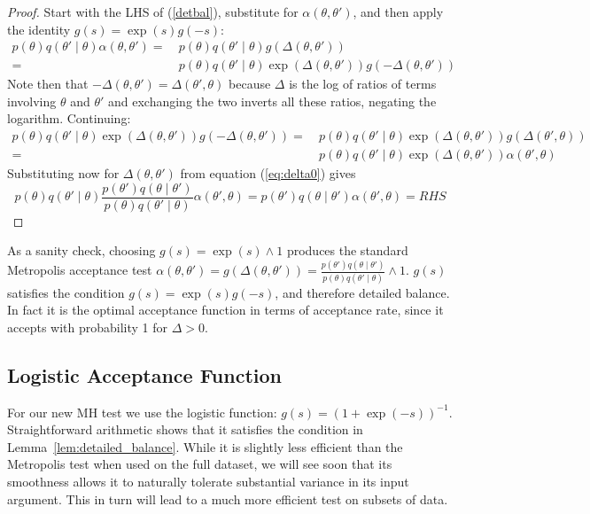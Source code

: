 \documentclass{article}
\begin{document}
\begin{proof}
  Start with the LHS of (\ref{detbal}), substitute for $\alpha(\theta,\theta')$, and then apply the
  identity $g(s) = \exp(s)g(-s)$:
  \begin{equation}\label{detbal1}
    \begin{split}
      p(\theta)q(\theta'\mid\theta)\alpha(\theta,\theta') =~ & p(\theta)q(\theta'\mid\theta)g(\Delta(\theta,\theta'))\\
      =~ & p(\theta)q(\theta'\mid\theta)\exp(\Delta(\theta,\theta'))g(-\Delta(\theta,\theta'))
    \end{split}
  \end{equation}
  Note then that $-\Delta(\theta,\theta') = \Delta(\theta',\theta)$ because $\Delta$ is the log of ratios of
  terms involving $\theta$ and $\theta'$ and exchanging the two inverts all these ratios, negating the
  logarithm. Continuing:
  \begin{equation}\label{detbal2}
    \begin{split}
    p(\theta)q(\theta'\mid\theta)\exp(\Delta(\theta,\theta'))g(-\Delta(\theta,\theta')) = ~ & p(\theta)q(\theta'\mid\theta)\exp(\Delta(\theta,\theta'))g(\Delta(\theta',\theta))\\
    = ~ & p(\theta)q(\theta'\mid\theta)\exp(\Delta(\theta,\theta'))\alpha(\theta',\theta)
    \end{split}
  \end{equation}
  Substituting now for $\Delta(\theta,\theta')$ from equation (\ref{eq:delta0}) gives
  \begin{equation*}\label{detbal3}
    p(\theta)q(\theta'\mid\theta)\frac{p(\theta')q(\theta\mid\theta')}{p(\theta)q(\theta'\mid\theta)}\alpha(\theta',\theta)
      = p(\theta')q(\theta\mid\theta')\alpha(\theta',\theta) = RHS
  \end{equation*}
\end{proof}

As a sanity check, choosing $g(s) = \exp(s) \wedge 1$ produces the
standard Metropolis acceptance test $\alpha(\theta,\theta') = g(\Delta(\theta,\theta')) = 
\frac{p(\theta')q(\theta \mid
  \theta')}{p(\theta)q(\theta' \mid \theta)}\wedge 1$. $g(s)$ satisfies
the condition $g(s) = \exp(s)g(-s)$, and therefore detailed
balance. In fact it is the optimal acceptance function in terms of
acceptance rate, since it accepts with probability 1 for $\Delta > 0$.

\subsection{Logistic Acceptance Function}
For our new MH test we use the logistic function:
$g(s)=(1+\exp(-s))^{-1}$. Straightforward arithmetic shows that it
satisfies the condition in Lemma~\ref{lem:detailed_balance}.  While it
is slightly less efficient than the Metropolis test when used on the
full dataset, we will see soon that its smoothness allows it to
naturally tolerate substantial variance in its input argument. This in
turn will lead to a much more efficient test on subsets of data.
\end{document}
